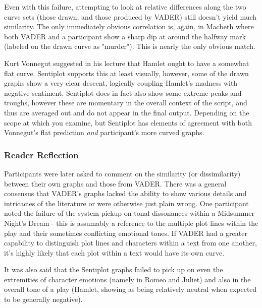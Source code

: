 \documentclass{article}
\begin{document}
            Even with this failure, attempting to look at relative differences along the two curve sets (those drawn, and those produced by VADER) still doesn't yield much similarity. The only immediately obvious correlation is, again, in Macbeth where both VADER and a participant show a sharp dip at around the halfway mark (labeled on the drawn curve as "murder"). This is nearly the only obvious match.
            
            Kurt Vonnegut suggested in his lecture that Hamlet ought to have a somewhat flat curve. Sentiplot supports this at least visually, however, some of the drawn graphs show a very clear descent, logically coupling Hamlet's madness with negative sentiment. Sentiplot does in fact also show some extreme peaks and troughs, however these are momentary in the overall context of the script, and thus are averaged out and do not appear in the final output. Depending on the scope at which you examine, but Sentiplot has elements of agreement with both Vonnegut's flat prediction \textit{and} participant's more curved graphs.
			\subsubsection{Reader Reflection}
                Participants were later asked to comment on the similarity (or dissimilarity) between their own graphs and those from VADER. There was a general consensus that VADER's graphs lacked the ability to show various details and intricacies of the literature or were otherwise just plain wrong. 
                One participant noted the failure of the system pickup on tonal dissonances within a Midsummer Night's Dream - this is assumably a reference to the multiple plot lines within the play and their sometimes conflicting emotional tones. If VADER had a greater capability to distinguish plot lines and characters within a text from one another, it's highly likely that each plot within a text would have its own curve.
                
                It was also said that the Sentiplot graphs failed to pick up on even the extremities of character emotions (namely in Romeo and Juliet) and also in the overall tone of a play (Hamlet, showing as being relatively neutral when expected to be generally negative).
\end{document}
